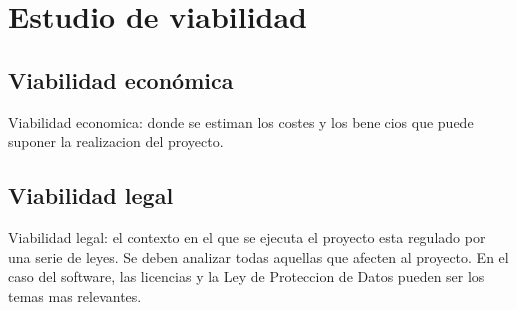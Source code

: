 \section{Estudio de viabilidad}

\subsection{Viabilidad económica}
Viabilidad economica: donde se estiman los costes y los benecios
que puede suponer la realizacion del proyecto.

\subsection{Viabilidad legal}
Viabilidad legal: el contexto en el que se ejecuta el proyecto esta regulado
por una serie de leyes. Se deben analizar todas aquellas que afecten
al proyecto. En el caso del software, las licencias y la Ley de Proteccion
de Datos pueden ser los temas mas relevantes.

